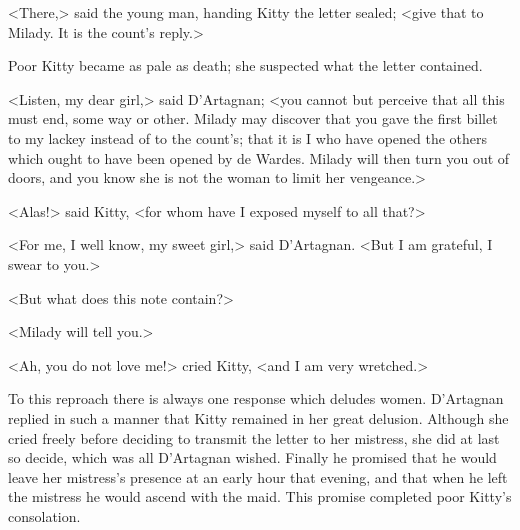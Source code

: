 <There,> said the young man, handing Kitty the letter sealed; <give that to Milady. It is the count's reply.> 

Poor Kitty became as pale as death; she suspected what the letter contained. 

<Listen, my dear girl,> said D'Artagnan; <you cannot but perceive that all this must end, some way or other. Milady may discover that you gave the first billet to my lackey instead of to the count's; that it is I who have opened the others which ought to have been opened by de Wardes. Milady will then turn you out of doors, and you know she is not the woman to limit her vengeance.> 

<Alas!> said Kitty, <for whom have I exposed myself to all that?> 

<For me, I well know, my sweet girl,> said D'Artagnan. <But I am grateful, I swear to you.> 

<But what does this note contain?> 

<Milady will tell you.> 

<Ah, you do not love me!> cried Kitty, <and I am very wretched.> 

To this reproach there is always one response which deludes women. D'Artagnan replied in such a manner that Kitty remained in her great delusion. Although she cried freely before deciding to transmit the letter to her mistress, she did at last so decide, which was all D'Artagnan wished. Finally he promised that he would leave her mistress's presence at an early hour that evening, and that when he left the mistress he would ascend with the maid. This promise completed poor Kitty's consolation. 